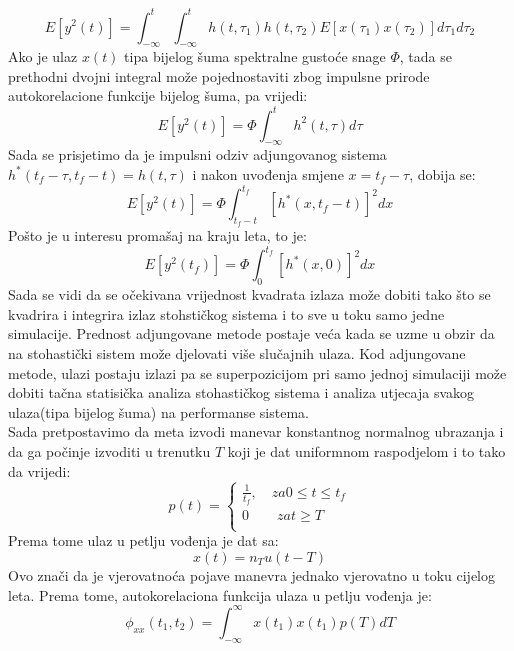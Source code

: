 \begin{equation}
    E[y^2(t)]=\int_{-\infty}^t\int_{-\infty}^th(t,\tau_1)h(t,\tau_2)E[x(\tau_1)x(\tau_2)]d\tau_1d\tau_2
\end{equation}
Ako je ulaz $x(t)$ tipa bijelog šuma spektralne gustoće snage $\Phi$, tada se prethodni 
dvojni integral može pojednostaviti zbog impulsne prirode autokorelacione funkcije 
bijelog šuma, pa vrijedi:
\begin{equation}
    E[y^2(t)]=\Phi \int_{-\infty}^t h^2(t,\tau)d\tau
\end{equation}
Sada se prisjetimo da je impulsni odziv adjungovanog sistema $h^*(t_f-\tau,t_f-t)=h(t,\tau)$
 i nakon uvođenja smjene $x=t_f-\tau$, dobija se:
\begin{equation}
    E[y^2(t)]=\Phi\int_{t_f-t}^{t_f}[h^*(x,t_f-t)]^2dx
\end{equation}
Pošto je u interesu promašaj na kraju leta, to je:
\begin{equation}
    E[y^2(t_f)]=\Phi\int_{0}^{t_f}[h^*(x,0)]^2dx
\end{equation}
Sada se vidi da se očekivana vrijednost kvadrata izlaza može dobiti tako što se 
kvadrira i integrira izlaz stohstičkog sistema i to sve u toku samo jedne simulacije. 
Prednost adjungovane metode postaje veća kada se uzme u obzir da na stohastički sistem 
može djelovati više slučajnih ulaza. Kod adjungovane metode, ulazi postaju izlazi pa se 
superpozicijom pri samo jednoj simulaciji može dobiti tačna statisička analiza stohastičkog sistema i 
analiza utjecaja svakog ulaza(tipa bijelog šuma) na performanse sistema. \\
Sada pretpostavimo da meta izvodi manevar konstantnog normalnog ubrazanja i da ga 
počinje izvoditi u trenutku $T$ koji je dat uniformnom raspodjelom i to tako da vrijedi:
\begin{equation}
    p(t)=
    \begin{cases}
        \frac{1}{t_f}, \quad za 0\leq t\leq t_f\\
        0 \qquad za t\geq T\\
    \end{cases}
\end{equation}
Prema tome ulaz u petlju vođenja je dat sa:
\begin{equation}
    x(t)=n_Tu(t-T)
\end{equation}
Ovo znači da je vjerovatnoća pojave manevra jednako vjerovatno u toku cijelog leta. 
Prema tome, autokorelaciona funkcija ulaza u petlju vođenja je:
\begin{equation}
    \phi_{xx}(t_1,t_2)=\int_{-\infty}^{\infty}x(t_1)x(t_1)p(T)dT
\end{equation}
